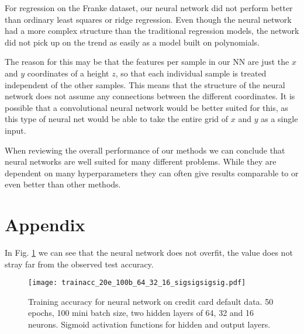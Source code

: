 \documentclass[%
 reprint,
nofootinbib,
 amsmath,amssymb,
 aps,
]{revtex4-2}
\begin{document}
For regression on the Franke dataset, our neural network did not perform better than ordinary least squares or ridge regression. Even though the neural network had a more complex structure than the traditional regression models, the network did not pick up on the trend as easily as a model built on polynomials.

The reason for this may be that the features per sample in our NN are just the $x$ and $y$ coordinates of a height $z$, so that each individual sample is treated independent of the other samples. This means that the structure of the neural network does not assume any connections between the different coordinates. It is possible that a convolutional neural network would be better suited for this, as this type of neural net would be able to take the entire grid of $x$ and $y$ as a single input.

When reviewing the overall performance of our methods we can conclude that neural networks are well suited for many different problems. While they are dependent on many hyperparameters they can often give results comparable to or even better than other methods.


\appendix
\section{Appendix}
In Fig. \ref{fig:train_acc} we can see that the neural network does not overfit, the value does not stray far from the observed test accuracy.
\begin{figure}[b]
\texttt{[image: trainacc\_20e\_100b\_64\_32\_16\_sigsigsigsig.pdf]}
\caption{\label{fig:train_acc} Training accuracy for neural network on credit card default data. 50 epochs, 100 mini batch size, two hidden layers of 64, 32 and 16 neurons. Sigmoid activation functions for hidden and output layers.}
\end{figure}


\end{document}
